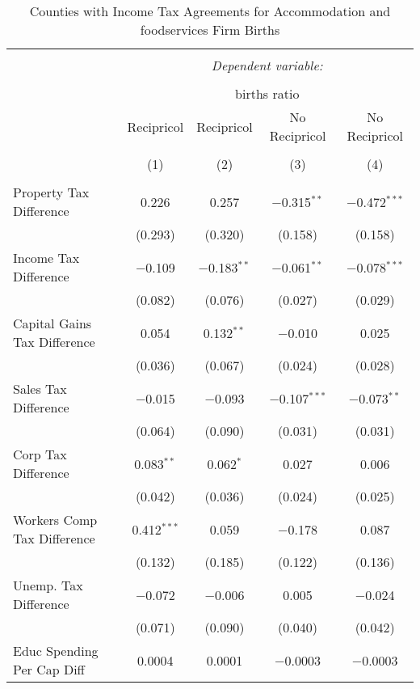 
\begin{table}[!htbp] \centering 
  \caption{Counties with Income Tax Agreements for  Accommodation and foodservices Firm Births} 
  \label{72agreement} 
\begin{tabular}{@{\extracolsep{5pt}}lcccc} 
\\[-1.8ex]\hline 
\hline \\[-1.8ex] 
 & \multicolumn{4}{c}{\textit{Dependent variable:}} \\ 
\cline{2-5} 
\\[-1.8ex] & \multicolumn{4}{c}{births ratio} \\ 
 & Recipricol & Recipricol & No Recipricol & No Recipricol \\ 
\\[-1.8ex] & (1) & (2) & (3) & (4)\\ 
\hline \\[-1.8ex] 
 Property Tax Difference & 0.226 & 0.257 & $-$0.315$^{**}$ & $-$0.472$^{***}$ \\ 
  & (0.293) & (0.320) & (0.158) & (0.158) \\ 
  Income Tax Difference & $-$0.109 & $-$0.183$^{**}$ & $-$0.061$^{**}$ & $-$0.078$^{***}$ \\ 
  & (0.082) & (0.076) & (0.027) & (0.029) \\ 
  Capital Gains Tax Difference & 0.054 & 0.132$^{**}$ & $-$0.010 & 0.025 \\ 
  & (0.036) & (0.067) & (0.024) & (0.028) \\ 
  Sales Tax Difference & $-$0.015 & $-$0.093 & $-$0.107$^{***}$ & $-$0.073$^{**}$ \\ 
  & (0.064) & (0.090) & (0.031) & (0.031) \\ 
  Corp Tax Difference & 0.083$^{**}$ & 0.062$^{*}$ & 0.027 & 0.006 \\ 
  & (0.042) & (0.036) & (0.024) & (0.025) \\ 
  Workers Comp Tax Difference & 0.412$^{***}$ & 0.059 & $-$0.178 & 0.087 \\ 
  & (0.132) & (0.185) & (0.122) & (0.136) \\ 
  Unemp. Tax Difference & $-$0.072 & $-$0.006 & 0.005 & $-$0.024 \\ 
  & (0.071) & (0.090) & (0.040) & (0.042) \\ 
  Educ Spending Per Cap Diff & 0.0004 & 0.0001 & $-$0.0003 & $-$0.0003 \\ 

\end{tabular}
\end{table}
